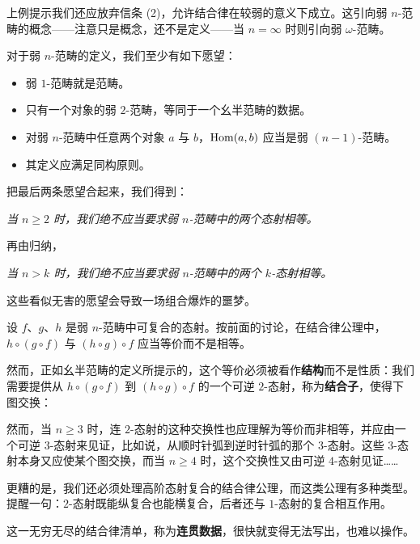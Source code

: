 \nitem\label{L1-3.5} 上例提示我们还应放弃信条 (2)，允许结合律在较弱的意义下成立。这引向弱 $n$-范畴的概念——注意只是概念，还不是定义——当 $n=\infty$ 时则引向弱 $\omega$-范畴。

对于弱 $n$-范畴的定义，我们至少有如下愿望：
\begin{itemize}[leftmargin=2.2em,itemsep=0.1em]
\item 弱 $1$-范畴就是范畴。
\item 只有一个对象的弱 $2$-范畴，等同于一个幺半范畴的数据。
\item 对弱 $n$-范畴中任意两个对象 $a$ 与 $b$，$\operatorname{Hom}(a,b)$ 应当是弱 $(n-1)$-范畴。
\item 其定义应满足同构原则。
\end{itemize}

把最后两条愿望合起来，我们得到：
\begin{center}
\emph{当 $n\ge 2$ 时，我们绝不应当要求弱 $n$-范畴中的两个态射相等。}
\end{center}
再由归纳，
\begin{center}
\emph{当 $n>k$ 时，我们绝不应当要求弱 $n$-范畴中的两个 $k$-态射相等。}
\end{center}
这些看似无害的愿望会导致一场组合爆炸的噩梦。

\nitem\label{L1-3.6} 设 $f$、$g$、$h$ 是弱 $n$-范畴中可复合的态射。按前面的讨论，在结合律公理中，$h\circ(g\circ f)$ 与 $(h\circ g)\circ f$ 应当等价而不是相等。

然而，正如幺半范畴的定义所提示的，这个等价必须被看作\textbf{结构}而不是性质：我们需要提供从 $h\circ(g\circ f)$ 到 $(h\circ g)\circ f$ 的一个可逆 $2$-态射，称为\textbf{结合子}，使得下图交换：
\begin{center}
\end{center}
然而，当 $n\ge 3$ 时，连 $2$-态射的这种交换性也应理解为等价而非相等，并应由一个可逆 $3$-态射来见证，比如说，从顺时针弧到逆时针弧的那个 $3$-态射。这些 $3$-态射本身又应使某个图交换，而当 $n\ge 4$ 时，这个交换性又由可逆 $4$-态射见证……

更糟的是，我们还必须处理高阶态射复合的结合律公理，而这类公理有多种类型。提醒一句：$2$-态射既能纵复合也能横复合，后者还与 $1$-态射的复合相互作用。

这一无穷无尽的结合律清单，称为\textbf{连贯数据}，很快就变得无法写出，也难以操作。

